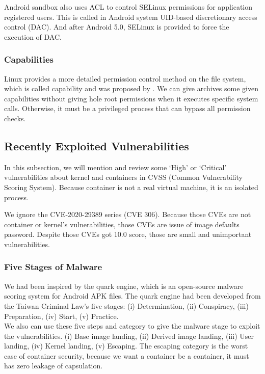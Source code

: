 Android sandbox also uses ACL to control SELinux permissions for application registered users.
This is called in Android system UID-based discretionary access control (DAC).
And after Android 5.0, SELinux is provided to force the execution of DAC.

\subsubsection{Capabilities}
\label{Capabilities}
Linux provides a more detailed permission control method on the file system, which is called
capability and was proposed by \citeauthor{6234805}. We can give archives some given capabilities
without giving hole root permissions when it executes specific system calls. Otherwise, it
must be a privileged process that can bypass all permission checks.

\subsection{Recently Exploited Vulnerabilities}
In this subsection, we will mention and review some `High' or `Critical' vulnerabilities
about kernel and containers in CVSS (Common Vulnerability Scoring System).
Because container is not a real virtual machine, it is an isolated process.

We ignore the CVE-2020-29389 series (CVE 306). Because those CVEs are not container or kernel's
vulnerabilities, those CVEs are issue of image defaults password. Despite those CVEs got 10.0 score,
those are small and unimportant vulnerabilities.

\subsubsection{Five Stages of Malware}
\label{Five_stage_of_malware}
We had been inspired by the quark engine,%
which is an open-source malware scoring system for Android APK files. The quark
engine had been developed from the Taiwan Criminal Law's five stages:
(\Rn{1}) Determination, (\Rn{2}) Conspiracy, (\Rn{3}) Preparation, (\Rn{4}) Start, (\Rn{5}) Practice.\\

We also can use these five steps and category to give the malware stage to exploit the vulnerabilities.
(\Rn{1}) Base image landing, (\Rn{2}) Derived image landing, (\Rn{3}) User landing, (\Rn{4}) Kernel landing,
(\Rn{5}) Escaping. The escaping category is the worst case of container security, because we want a
container be a container, it must has zero leakage of capsulation.

